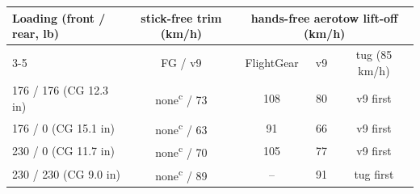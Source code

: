 \begin{tabular}{lcccc}
\toprule
Loading (front / rear, lb) & stick-free trim (km/h) & \multicolumn{3}{c}{hands-free aerotow lift-off (km/h)} \\
\cmidrule(lr){3-5}
 & FG / v9 & FlightGear & v9 & tug (85 km/h) \\
\midrule
176 / 176 (CG 12.3 in) & none\textsuperscript{c} / 73 & 108 & 80 & v9 first \\
176 / 0 (CG 15.1 in) & none\textsuperscript{c} / 63 & 91 & 66 & v9 first \\
230 / 0 (CG 11.7 in) & none\textsuperscript{c} / 70 & 105 & 77 & v9 first \\
230 / 230 (CG 9.0 in) & none\textsuperscript{c} / 89 & -- & 91 & tug first \\
\bottomrule
\end{tabular}
